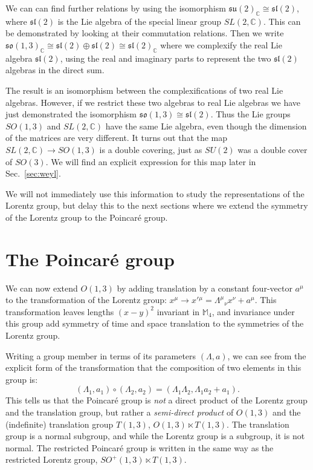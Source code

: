 \documentclass[notes.tex]{subfiles}
\begin{document}
We can can find further relations by using the isomorphism $\mathfrak{su}(2)_{\mathbb C}\cong \mathfrak{sl}(2)$, where $\mathfrak{sl}(2)$ is the Lie algebra of the special linear group $SL(2,\mathbb C)$. This can be demonstrated by looking at their commutation relations. Then we write
$\mathfrak{so}(1,3)_{\mathbb C}\cong \mathfrak{sl}(2)\oplus\mathfrak{sl}(2)\cong\mathfrak{sl}(2)_{\mathbb C}$ where we complexify the real Lie algebra $\mathfrak{sl}(2)$, using the real and imaginary parts to represent the two $\mathfrak{sl}(2)$ algebras in the direct sum.

The result is an isomorphism between the complexifications of two real Lie algebras. However, if we restrict these two algebras to real Lie algebras we have just demonstrated the isomorphism $\mathfrak{so}(1,3)\cong \mathfrak{sl}(2)$. Thus the Lie groups $SO(1,3)$ and $SL(2,\mathbb C)$ have the same Lie algebra, even though the dimension of the matrices are very different. It turns out that the map $SL(2,\mathbb C)\to SO(1,3)$ is a double covering, just as $SU(2)$ was a double cover of $SO(3)$. We will find an explicit expression for this map later in Sec.~\ref{sec:weyl}.

We will not immediately use this information to study the representations of the Lorentz group, but delay this to the next sections where we extend the symmetry of the Lorentz group to the Poincaré group. 


\section{The Poincaré group}
We can now extend $O(1,3)$ by adding translation by a constant four-vector $a^\mu$ to the transformation of the Lorentz group:  $x^\mu \to x'{}^\mu = \Lambda^\mu{}_\nu x^\nu + a^\mu$. This transformation leaves lengths $(x-y)^2$ invariant in $\mathbb{M}_4$, and invariance under this group add symmetry of time and space translation to the symmetries of the Lorentz group.

Writing a group member in terms of its parameters $(\Lambda, a)$, we can see  from the explicit form of the transformation that the composition of two elements in this group is:
\[(\Lambda_1, a_1)\circ(\Lambda_2, a_2) = (\Lambda_1\Lambda_2, \Lambda_1a_2 + a_1).\]
This tells us that the Poincar\'{e} group is {\it not} a direct product of the Lorentz group and the translation group, but rather a {\it semi-direct product} of $O(1,3)$ and the (indefinite) translation group $T(1,3)$, $O(1,3) \ltimes T(1,3)$. The translation group is a normal subgroup, and while the Lorentz group is a subgroup, it is not normal. The restricted Poincaré group is written in the same way as the restricted Lorentz group, $SO^+(1,3) \ltimes T(1,3)$.
\end{document}

